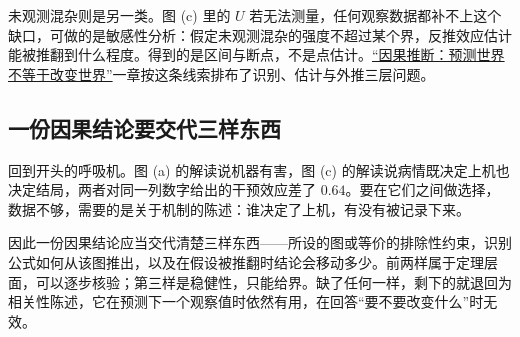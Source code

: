 未观测混杂则是另一类。图 (c) 里的 \(U\) 若无法测量，任何观察数据都补不上这个缺口，可做的是敏感性分析：假定未观测混杂的强度不超过某个界，反推效应估计能被推翻到什么程度。得到的是区间与断点，不是点估计。\hyperref[ch:120]{``因果推断：预测世界不等于改变世界''}一章按这条线索排布了识别、估计与外推三层问题。

\subsection{一份因果结论要交代三样东西}

回到开头的呼吸机。图 (a) 的解读说机器有害，图 (c) 的解读说病情既决定上机也决定结局，两者对同一列数字给出的干预效应差了 \(0.64\)。要在它们之间做选择，数据不够，需要的是关于机制的陈述：谁决定了上机，有没有被记录下来。

因此一份因果结论应当交代清楚三样东西——所设的图或等价的排除性约束，识别公式如何从该图推出，以及在假设被推翻时结论会移动多少。前两样属于定理层面，可以逐步核验；第三样是稳健性，只能给界。缺了任何一样，剩下的就退回为相关性陈述，它在预测下一个观察值时依然有用，在回答``要不要改变什么''时无效。
